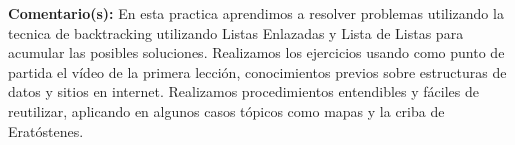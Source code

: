 \noindent\textbf{Comentario(s):} 
En esta practica aprendimos a resolver problemas utilizando la tecnica de backtracking utilizando Listas Enlazadas y Lista de Listas para acumular las posibles soluciones. Realizamos los ejercicios usando como punto de partida el vídeo de la primera lección, conocimientos previos sobre estructuras de datos y sitios en internet. Realizamos procedimientos entendibles y fáciles de reutilizar, aplicando en algunos casos tópicos como mapas y la criba de Eratóstenes.